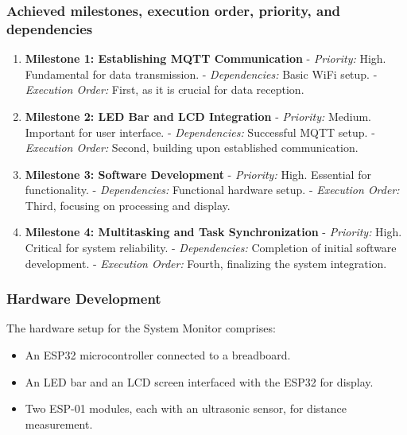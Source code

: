 \documentclass{article}
\begin{document}
\subsubsection{Achieved milestones, execution order, priority, and dependencies}
\begin{enumerate}
    \item \textbf{Milestone 1: Establishing MQTT Communication}
       - \textit{Priority:} High. Fundamental for data transmission.
       - \textit{Dependencies:} Basic WiFi setup.
       - \textit{Execution Order:} First, as it is crucial for data reception.

    \item \textbf{Milestone 2: LED Bar and LCD Integration}
       - \textit{Priority:} Medium. Important for user interface.
       - \textit{Dependencies:} Successful MQTT setup.
       - \textit{Execution Order:} Second, building upon established communication.

    \item \textbf{Milestone 3: Software Development}
       - \textit{Priority:} High. Essential for functionality.
       - \textit{Dependencies:} Functional hardware setup.
       - \textit{Execution Order:} Third, focusing on processing and display.

    \item \textbf{Milestone 4: Multitasking and Task Synchronization}
       - \textit{Priority:} High. Critical for system reliability.
       - \textit{Dependencies:} Completion of initial software development.
       - \textit{Execution Order:} Fourth, finalizing the system integration.
\end{enumerate}

\subsubsection{Hardware Development}
The hardware setup for the System Monitor comprises:
\begin{itemize}
    \item An ESP32 microcontroller connected to a breadboard.
    \item An LED bar and an LCD screen interfaced with the ESP32 for display.
    \item Two ESP-01 modules, each with an ultrasonic sensor, for distance measurement.
\end{itemize}
\end{document}
